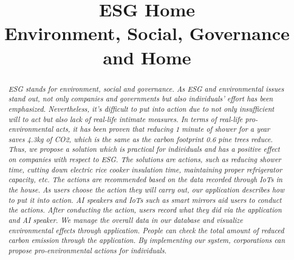 \documentclass[11pt, conference]{IEEEtran}
\begin{document}
\title{ESG Home\\
\small{Environment, Social, Governance and Home\\}
}

\author{
\and
{}
\and
{}
\and
{}
}
\maketitle

\begin{abstract}
\textit{ESG stands for environment, social and governance. As ESG and environmental issues stand out, not only companies and governments but also individuals’ effort has been emphasized. Nevertheless, it’s difficult to put into action due to not only insufficient will to act but also lack of real-life intimate measures. In terms of real-life pro-environmental acts, it has been proven that reducing 1 minute of shower for a year saves 4.3kg of CO2, which is the same as the carbon footprint 0.6 pine trees reduce. Thus, we propose a solution which is practical for individuals and has a positive effect on companies with respect to ESG. The solutions are actions, such as reducing shower time, cutting down electric rice cooker insulation time, maintaining proper refrigerator capacity, etc. The actions are recommended based on the data recorded through IoTs in the house. As users choose the action they will carry out, our application describes how to put it into action. AI speakers and  IoTs such as smart mirrors aid users to conduct the actions. After conducting the action, users record what they did via the application and AI speaker. We manage the overall data in our database and visualize environmental effects through application. People can check the total amount of reduced carbon emission through the application. By implementing our system, corporations can propose pro-environmental actions for individuals.\\}
\end{abstract}
\end{document}
